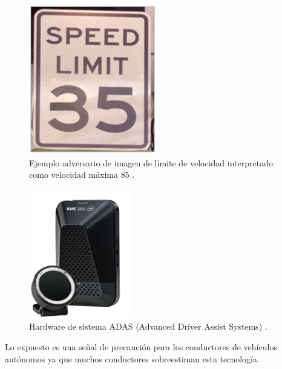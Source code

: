 \begin{figure}[th]
\centering
\includegraphics [scale = 1] {Figures/figura_29.PNG}
\decoRule
\caption[Ejemplo adversario de imagen de límite de velocidad]{Ejemplo adversario de imagen de límite de velocidad interpretado como velocidad máxima 85 \parencite{r53}.}
\label{fig:29}
\end{figure}

\begin{figure}[th]
\centering
\includegraphics [scale = 1] {Figures/figura_30.PNG}
\decoRule
\caption[Hardware de sistema ADAS (Advanced Driver Assist Systems) ]{Hardware de sistema ADAS (Advanced Driver Assist Systems) \parencite{r53}.}
\label{fig:30}
\end{figure}
Lo expuesto es una señal de precaución para los conductores de vehículos autónomos ya que muchos conductores sobreestiman esta tecnología.




